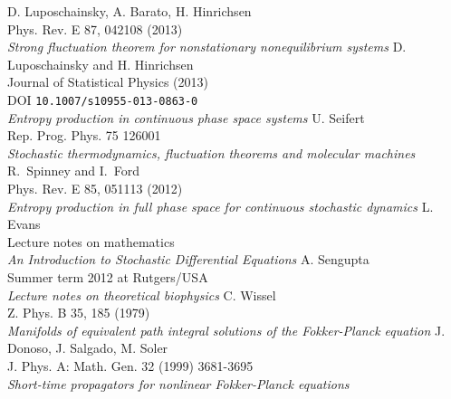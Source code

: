 \begin{thebibliography}{99}
	 {
		D. Luposchainsky, A. Barato, H. Hinrichsen \\
		Phys. Rev. E 87, 042108 (2013) \\
		\emph{Strong fluctuation theorem for nonstationary nonequilibrium systems}
		}
	 {
		D. Luposchainsky and H. Hinrichsen \\
		Journal of Statistical Physics (2013) \\
		DOI \texttt{10.1007/s10955-013-0863-0} \\
		\emph{Entropy production in continuous phase space systems}
		}
	 {
		U. Seifert \\
		Rep. Prog. Phys. 75 126001 \\
		\emph{Stochastic thermodynamics, fluctuation theorems and molecular machines}
		}
	 {
		R.~Spinney and I.~Ford \\
		Phys. Rev. E 85, 051113 (2012) \\
		\emph{Entropy production in full phase space for continuous stochastic dynamics}
		}
	 {
		L. Evans \\
		Lecture notes on mathematics \\
		\emph{An Introduction to Stochastic Differential Equations}
		}
	 {
		A. Sengupta \\
		Summer term 2012 at Rutgers/USA \\
		\emph{Lecture notes on theoretical biophysics}
		}
	 {
		C. Wissel \\
		Z. Phys. B 35, 185 (1979) \\
		\emph{Manifolds of equivalent path integral solutions of the Fokker-Planck equation}
		}
	 {
		J. Donoso, J. Salgado, M. Soler \\
		J. Phys. A: Math. Gen. 32 (1999) 3681-3695 \\
		\emph{Short-time propagators for nonlinear Fokker-Planck equations}
		}

		
\end{thebibliography}
